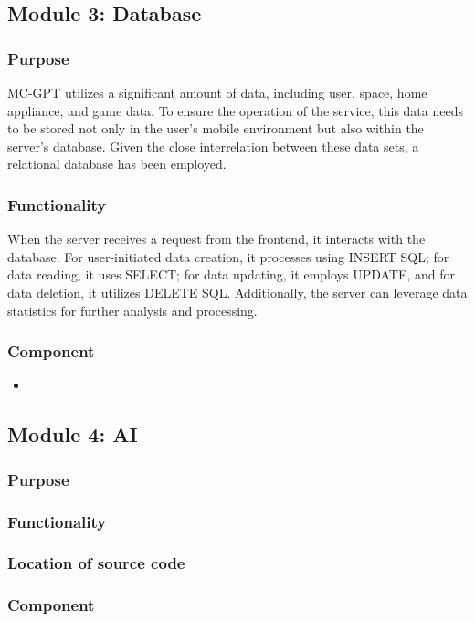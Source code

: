 \documentclass[conference]{IEEEtran}
\begin{document}
    \subsection{Module 3: Database}
        \subsubsection{Purpose}
            MC-GPT utilizes a significant amount of data, including user, space, home appliance, and game data. To ensure the operation of the service, this data needs to be stored not only in the user's mobile environment but also within the server's database. Given the close interrelation between these data sets, a relational database has been employed.\\
        \subsubsection{Functionality}
            When the server receives a request from the frontend, it interacts with the database. For user-initiated data creation, it processes using INSERT SQL; for data reading, it uses SELECT; for data updating, it employs UPDATE, and for data deletion, it utilizes DELETE SQL. Additionally, the server can leverage data statistics for further analysis and processing.\\
        \subsubsection{Component}
            \begin{itemize}
                \item 
            \end{itemize}
    \subsection{Module 4: AI}
        \subsubsection{Purpose}
        \subsubsection{Functionality}
        \subsubsection{Location of source code}
        \subsubsection{Component}
    
\end{document}
